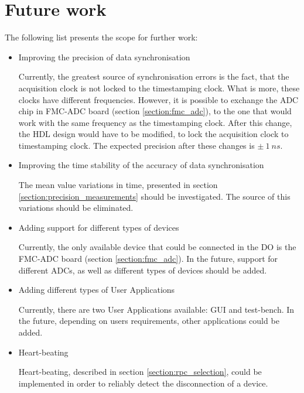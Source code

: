 \section{Future work}
The following list presents the scope for further work:
\begin{itemize}

    \item Improving the precision of data synchronisation
    
    Currently, the greatest source of synchronisation errors is the fact, that the acquisition clock is not locked to the timestamping clock. What is more, these clocks have different frequencies. However, it is possible to exchange the ADC chip in FMC-ADC board (section \ref{section:fmc_adc}), to the one that would work with the same frequency as the timestamping clock. After this change, the HDL design would have to be modified, to lock the acquisition clock to timestamping clock. The expected precision after these changes is  $\pm~1~ns$.
    \item Improving the time stability of the accuracy of data synchronisation
    
    The mean value variations in time, presented in section \ref{section:precision_measurements} should be investigated. The source of this variations should be eliminated.
    \item Adding support for different types of devices
    
    Currently, the only available device that could be connected in the DO is the FMC-ADC board (section \ref{section:fmc_adc}). In the future, support for different ADCs, as well as different types of devices should be added.
    \item Adding different types of User Applications
    
    Currently, there are two User Applications available: GUI and test-bench. In the future, depending on users requirements, other applications could be added. 
    
    \item Heart-beating
    
    Heart-beating, described in section \ref{section:rpc_selection}, could be implemented in order to reliably detect the disconnection of a device.
\end{itemize}

\vfill %

